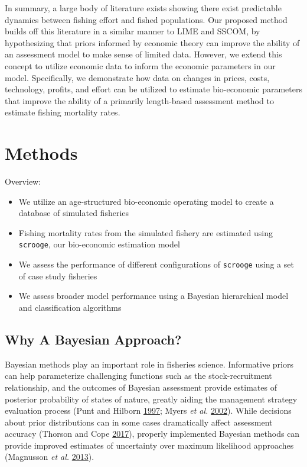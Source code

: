 \documentclass[twoside,12pt,final]{ucthesis-CA2012}
\begin{document}
\begin{ucmainmatter}
In summary, a large body of literature exists showing there exist
predictable dynamics between fishing effort and fished populations. Our
proposed method builds off this literature in a similar manner to LIME
and SSCOM, by hypothesizing that priors informed by economic theory can
improve the ability of an assessment model to make sense of limited
data. However, we extend this concept to utilize economic data to inform
the economic parameters in our model. Specifically, we demonstrate how
data on changes in prices, costs, technology, profits, and effort can be
utilized to estimate bio-economic parameters that improve the ability of
a primarily length-based assessment method to estimate fishing mortality
rates.

\section{Methods}\label{methods-3}

Overview:
\begin{itemize}
\item
  We utilize an age-structured bio-economic operating model to create a
  database of simulated fisheries
\item
  Fishing mortality rates from the simulated fishery are estimated using
  \texttt{scrooge}, our bio-economic estimation model
\item
  We assess the performance of different configurations of
  \texttt{scrooge} using a set of case study fisheries
\item
  We assess broader model performance using a Bayesian hierarchical
  model and classification algorithms
\end{itemize}
\subsection{Why A Bayesian Approach?}\label{why-a-bayesian-approach}

Bayesian methods play an important role in fisheries science.
Informative priors can help parameterize challenging functions such as
the stock-recruitment relationship, and the outcomes of Bayesian
assessment provide estimates of posterior probability of states of
nature, greatly aiding the management strategy evaluation process (Punt
and Hilborn \protect\hyperlink{ref-Punt1997}{1997}; Myers \emph{et al.}
\protect\hyperlink{ref-Myers2002}{2002}). While decisions about prior
distributions can in some cases dramatically affect assessment accuracy
(Thorson and Cope \protect\hyperlink{ref-Thorson2017a}{2017}), properly
implemented Bayesian methods can provide improved estimates of
uncertainty over maximum likelihood approaches (Magnusson \emph{et al.}
\protect\hyperlink{ref-Magnusson2013}{2013}).


\end{ucmainmatter}
\end{document}
